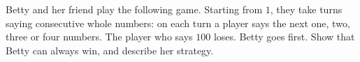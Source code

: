 Betty and her friend play the following game. Starting from $1$, they take turns saying consecutive whole numbers: on each turn a player says the next one, two, three or four numbers. The player who says $100$ loses. Betty goes first. Show that Betty can always win, and describe her strategy.

